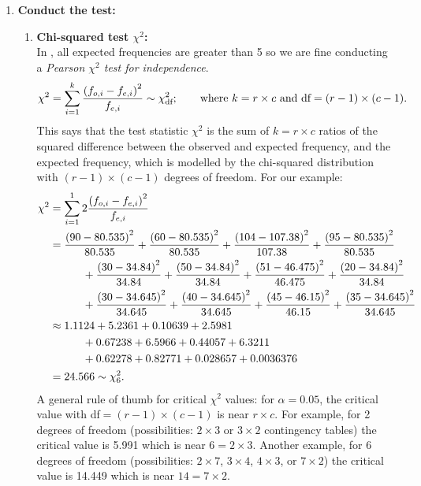 \begin{enumerate}
    \item \textbf{Conduct the test:}
    \begin{enumerate}
        \item \textbf{Chi-squared test $\chi^2$:} \\
        In , all expected frequencies are greater than 5 so we are fine conducting a \textit{Pearson $\chi^2$ test for independence}. 
        \begin{align}
            \chi^2 &= \sum_{i=1}^k \frac{\left( f_{o,i} - f_{e,i}\right)^2}{f_{e,i}} \sim \chi^2_{\text{df}}; \qquad \text{where } k = r \times c \text{ and df}=(r-1)\times (c-1).
        \end{align}
        This says that the test statistic $\chi^2$ is the sum of $k = r \times c$ ratios of the squared difference between the observed and expected frequency, and the expected frequency, which is modelled by the chi-squared distribution with $(r-1)\times (c-1)$ degrees of freedom. For our example:
        \begin{align}
            \chi^2 &= \sum_{i=1}^12 \frac{\left( f_{o,i} - f_{e,i}\right)^2}{f_{e,i}} \\
            &= \frac{\left( 90 - 80.535\right)^2}{80.535} + \frac{\left( 60 - 80.535\right)^2}{80.535} + \frac{\left( 104 - 107.38\right)^2}{107.38} + \frac{\left( 95 - 80.535\right)^2}{80.535} \\
            &{} \qquad {} \quad + \frac{\left( 30 - 34.84\right)^2}{34.84} + \frac{\left( 50 - 34.84\right)^2}{34.84} + \frac{\left( 51 - 46.475\right)^2}{46.475} + \frac{\left( 20 - 34.84\right)^2}{34.84} \\
            &{} \qquad {} \quad + \frac{\left( 30 - 34.645\right)^2}{34.645} + \frac{\left( 40 - 34.645\right)^2}{34.645} + \frac{\left( 45 - 46.15\right)^2}{46.15} + \frac{\left( 35 - 34.645\right)^2}{34.645} \\
            &\approx 1.1124 + 5.2361 + 0.10639 + 2.5981 \\
            &{} \qquad {} \quad + 0.67238 + 6.5966 + 0.44057 + 6.3211 \\
            &{} \qquad {} \quad + 0.62278 + 0.82771 + 0.028657 + 0.0036376 \\
            &= 24.566 \sim \chi^2_{6}.
        \end{align}
        A general rule of thumb for critical $\chi^2$ values: for $\alpha = 0.05$, the critical value with df$= (r-1) \times (c-1)$ is near $r \times c$. For example, for 2 degrees of freedom (possibilities: $2 \times 3$ or $3 \times 2$ contingency tables) the critical value is 5.991 which is near $6 = 2 \times 3$. Another example, for 6 degrees of freedom (possibilities: $2 \times 7$, $3 \times 4$, $4 \times 3$, or $7 \times 2$) the critical value is 14.449 which is near $14=7 \times 2$. \\

\end{enumerate}
\end{enumerate}
